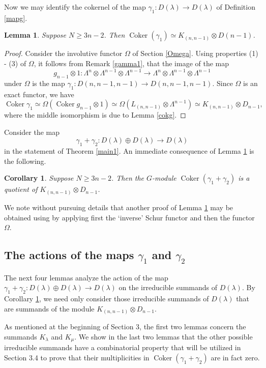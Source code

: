 \documentclass[11pt]{amsart}
\newtheorem{cor}[thm]{Corollary}
\newtheorem{lem}[thm]{Lemma}
\theoremstyle{definition}
\numberwithin{equation}{section}
\DeclareMathOperator{\coker}{Coker}
\begin{document}
Now we may identify the cokernel of the map $\gamma_1: D(\lambda) \to D(\lambda)$ of Definition \ref{mapg}.
\begin{lem}\label{lem37} Suppose $N \ge 3n-2$. Then $\coker(\gamma_1) \simeq K_{(n,n-1)} \otimes D(n-1)$.
\end{lem}
\begin{proof}
	Consider the involutive functor $\Omega$ of Section \ref{Omega}. Using properties (1) - (3) of $\Omega$, it follows from Remark \ref{gamma1}, that the image of the map  \[g_{n-1} \otimes 1: \Lambda^n \otimes \Lambda^{n-1} \otimes \Lambda^{n-1} \to \Lambda^n \otimes \Lambda^{n-1}\otimes \Lambda^{n-1}\] under $\Omega$ is the map $\gamma_1: D(n,n-1,n-1) \to D(n,n-1,n-1)$. Since $\Omega$ is an exact functor, we have  \[\coker{\gamma_1} \simeq \Omega (\coker{g_{n-1} \otimes 1}) \simeq \Omega (L_{(n,n-1)} \otimes \Lambda^{n-1}) \simeq K_{(n,n-1)} \otimes D_{n-1},\]
	where the middle isomorphism is due to Lemma \ref{cokg}.
\end{proof}

Consider the map \[\gamma_1 +\gamma_2 : D(\lambda) \oplus D(\lambda) \to D(\lambda) \] in the statement of Theorem \ref{main1}. An immediate consequence of Lemma \ref{lem37} is the following. 
\begin{cor}\label{cor38}
	Suppose $N \ge 3n-2$. Then the $G$-module $\coker{(\gamma_1+\gamma_2)}$ is a quotient of $K_{(n,n-1)} \otimes D_{n-1}$.
\end{cor}

We note without pursuing details that  another proof of Lemma \ref{lem37} may be obtained using \cite[Theorem 1.3]{FHSW} by applying first the `inverse' Schur functor \cite[pg. 56]{Gr} and then the functor $\Omega$.
\subsection{The actions of the maps $\gamma_1$ and $\gamma_2$}
The next four lemmas analyze the action of the map $\gamma_1 +\gamma_2 : D(\lambda) \oplus D(\lambda) \to D(\lambda)$ on the irreducible summands of $D(\lambda)$. By Corollary \ref{cor38}, we need only consider those irreducible summands of $D(\lambda)$ that are summands of the module $K_{(n,n-1)} \otimes D_{n-1}$.



As mentioned at the beginning of Section 3, the first two lemmas concern the summands $K_{\lambda}$ and $K_{\mu}$. We show in the last two lemmas that the other possible irreducible summands have a combinatorial property that will be utilized in Section 3.4 to prove that their multiplicities in $\coker(\gamma_1 +\gamma_2) $ are in fact zero.
\end{document}
